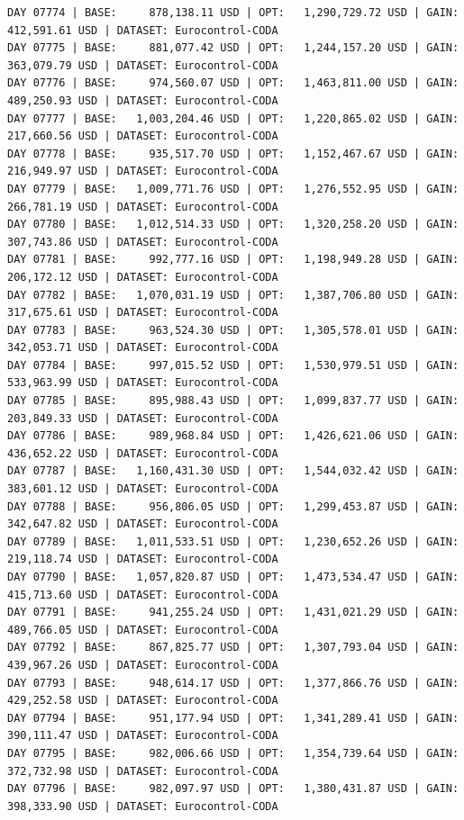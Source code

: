 \documentclass[11pt,a4paper]{article}
\begin{document}
\begin{verbatim}
DAY 07774 | BASE:     878,138.11 USD | OPT:   1,290,729.72 USD | GAIN: 412,591.61 USD | DATASET: Eurocontrol-CODA
DAY 07775 | BASE:     881,077.42 USD | OPT:   1,244,157.20 USD | GAIN: 363,079.79 USD | DATASET: Eurocontrol-CODA
DAY 07776 | BASE:     974,560.07 USD | OPT:   1,463,811.00 USD | GAIN: 489,250.93 USD | DATASET: Eurocontrol-CODA
DAY 07777 | BASE:   1,003,204.46 USD | OPT:   1,220,865.02 USD | GAIN: 217,660.56 USD | DATASET: Eurocontrol-CODA
DAY 07778 | BASE:     935,517.70 USD | OPT:   1,152,467.67 USD | GAIN: 216,949.97 USD | DATASET: Eurocontrol-CODA
DAY 07779 | BASE:   1,009,771.76 USD | OPT:   1,276,552.95 USD | GAIN: 266,781.19 USD | DATASET: Eurocontrol-CODA
DAY 07780 | BASE:   1,012,514.33 USD | OPT:   1,320,258.20 USD | GAIN: 307,743.86 USD | DATASET: Eurocontrol-CODA
DAY 07781 | BASE:     992,777.16 USD | OPT:   1,198,949.28 USD | GAIN: 206,172.12 USD | DATASET: Eurocontrol-CODA
DAY 07782 | BASE:   1,070,031.19 USD | OPT:   1,387,706.80 USD | GAIN: 317,675.61 USD | DATASET: Eurocontrol-CODA
DAY 07783 | BASE:     963,524.30 USD | OPT:   1,305,578.01 USD | GAIN: 342,053.71 USD | DATASET: Eurocontrol-CODA
DAY 07784 | BASE:     997,015.52 USD | OPT:   1,530,979.51 USD | GAIN: 533,963.99 USD | DATASET: Eurocontrol-CODA
DAY 07785 | BASE:     895,988.43 USD | OPT:   1,099,837.77 USD | GAIN: 203,849.33 USD | DATASET: Eurocontrol-CODA
DAY 07786 | BASE:     989,968.84 USD | OPT:   1,426,621.06 USD | GAIN: 436,652.22 USD | DATASET: Eurocontrol-CODA
DAY 07787 | BASE:   1,160,431.30 USD | OPT:   1,544,032.42 USD | GAIN: 383,601.12 USD | DATASET: Eurocontrol-CODA
DAY 07788 | BASE:     956,806.05 USD | OPT:   1,299,453.87 USD | GAIN: 342,647.82 USD | DATASET: Eurocontrol-CODA
DAY 07789 | BASE:   1,011,533.51 USD | OPT:   1,230,652.26 USD | GAIN: 219,118.74 USD | DATASET: Eurocontrol-CODA
DAY 07790 | BASE:   1,057,820.87 USD | OPT:   1,473,534.47 USD | GAIN: 415,713.60 USD | DATASET: Eurocontrol-CODA
DAY 07791 | BASE:     941,255.24 USD | OPT:   1,431,021.29 USD | GAIN: 489,766.05 USD | DATASET: Eurocontrol-CODA
DAY 07792 | BASE:     867,825.77 USD | OPT:   1,307,793.04 USD | GAIN: 439,967.26 USD | DATASET: Eurocontrol-CODA
DAY 07793 | BASE:     948,614.17 USD | OPT:   1,377,866.76 USD | GAIN: 429,252.58 USD | DATASET: Eurocontrol-CODA
DAY 07794 | BASE:     951,177.94 USD | OPT:   1,341,289.41 USD | GAIN: 390,111.47 USD | DATASET: Eurocontrol-CODA
DAY 07795 | BASE:     982,006.66 USD | OPT:   1,354,739.64 USD | GAIN: 372,732.98 USD | DATASET: Eurocontrol-CODA
DAY 07796 | BASE:     982,097.97 USD | OPT:   1,380,431.87 USD | GAIN: 398,333.90 USD | DATASET: Eurocontrol-CODA

\end{verbatim}
\end{document}
